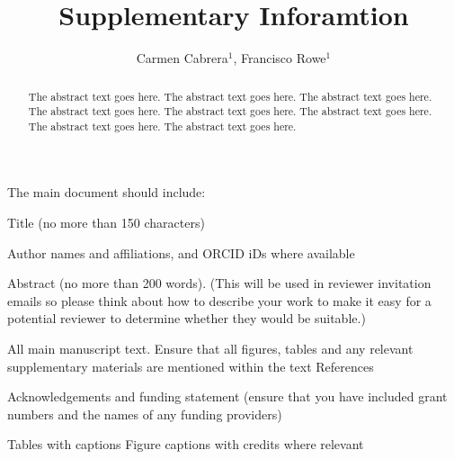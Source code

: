 \documentclass[]{rsos}%
\begin{document}
\title{Supplementary Inforamtion}

\author{
Carmen Cabrera$^{1}$,
Francisco Rowe$^{1}$}

\address{
  $^{1}$Geographic Data Science Lab, Department of Geography and Planning, University of Liverpool, Liverpool, United Kingdom.\\
  $^{}$}
\subject{
subject 1,
subject 2,
subject 3}



\begin{abstract}
The abstract text goes here. The abstract text goes here. The abstract text goes here. The abstract text goes here. The abstract text goes here. The abstract text goes here. The abstract text goes here. The abstract text goes here.
\end{abstract}

\providecommand{\EndFirstPage}{%
}

\maketitle

The main document should include:

Title (no more than 150 characters)

Author names and affiliations, and ORCID iDs where available

Abstract (no more than 200 words). (This will be used in reviewer
invitation emails so please think about how to describe your work to
make it easy for a potential reviewer to determine whether they would be
suitable.)

All main manuscript text. Ensure that all figures, tables and any
relevant supplementary materials are mentioned within the text
References

Acknowledgements and funding statement (ensure that you have included
grant numbers and the names of any funding providers)

Tables with captions Figure captions with credits where relevant
\end{document}
